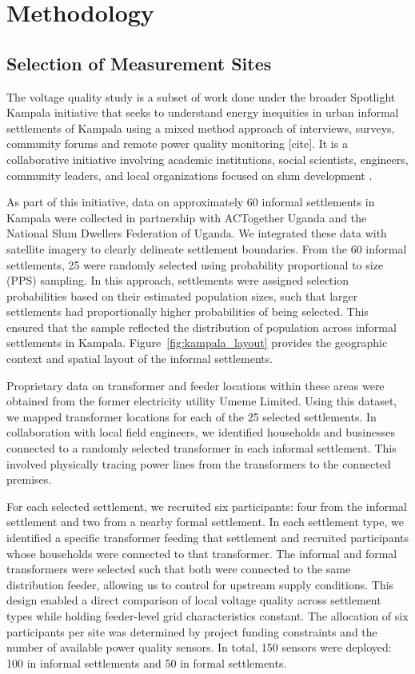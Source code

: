 \documentclass[review]{elsarticle}
\begin{document}
\FloatBarrier


\section{Methodology}
\label{sec:method}

\subsection{Selection of Measurement Sites}
The voltage quality study is a subset of work done under the broader Spotlight Kampala initiative that seeks to understand energy inequities in urban informal settlements of Kampala using a mixed method approach of interviews, surveys, community forums and remote power quality monitoring [cite]. It is a collaborative initiative involving academic institutions, social scientists, engineers, community leaders, and local organizations focused on slum development \cite{spotlightkampala}.
 

As part of this initiative, data on approximately 60 informal settlements in Kampala were collected in partnership with ACTogether Uganda  and the National Slum Dwellers Federation of Uganda. We integrated these data with satellite imagery to clearly delineate settlement boundaries. From the 60 informal settlements, 25 were randomly selected using probability proportional to size (PPS) sampling. In this approach, settlements were assigned selection probabilities based on their estimated population sizes, such that larger settlements had proportionally higher probabilities of being selected. This ensured that the sample reflected the distribution of population across informal settlements in Kampala. Figure~\ref{fig:kampala_layout} provides the geographic context and spatial layout of the informal settlements.


Proprietary data on transformer and feeder locations within these areas were obtained from the former electricity utility Umeme Limited. Using this dataset, we mapped transformer locations for each of the 25 selected settlements. In collaboration with local field engineers, we identified households and businesses connected to a randomly selected transformer in each informal settlement. This involved physically tracing power lines from the transformers to the connected premises.

For each selected settlement, we recruited six participants: four from the informal settlement and two from a nearby formal settlement. In each settlement type, we identified a specific transformer feeding that settlement and recruited participants whose households were connected to that transformer. The informal and formal transformers were selected such that both were connected to the same distribution feeder, allowing us to control for upstream supply conditions. This design enabled a direct comparison of local voltage quality across settlement types while holding feeder-level grid characteristics constant. The allocation of six participants per site was determined by project funding constraints and the number of available power quality sensors. In total, 150 sensors were deployed: 100 in informal settlements and 50 in formal settlements.
\end{document}

